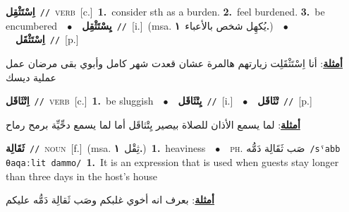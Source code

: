 \documentclass[10pt,a4paper,twoside]{article} %
\begin{document}
\begin{multicols}{2}
{{{{{{{{\setlength\topsep{0pt}\textbf{\foreignlanguage{arabic}{اِسْتَثْقِل}}\ {\color{gray}\texttt{//}\color{black}}\ \textsc{verb}\ [c.]\ \textbf{1.}~consider sth as a burden.  \textbf{2.}~feel burdened.  \textbf{3.}~be encumbered\ \ $\bullet$\ \ \setlength\topsep{0pt}\textbf{\foreignlanguage{arabic}{يِسْتَثْقِل}}\ {\color{gray}\texttt{//}\color{black}}\ [i.]\ \color{gray}(msa. \foreignlanguage{arabic}{يُكهِل شخص بالأعباء}~\foreignlanguage{arabic}{\textbf{١.}})\color{black}\ \ $\bullet$\ \ \setlength\topsep{0pt}\textbf{\foreignlanguage{arabic}{اِسْتَثْقَل}}\ {\color{gray}\texttt{//}\color{black}}\ [p.]\  \begin{flushright}\color{gray}\foreignlanguage{arabic}{\textbf{\underline{\foreignlanguage{arabic}{أمثلة}}}: أنا اِسْتَثْقَلِت زيارتهم هالمرة عشان قعدت شهر كامل وأبوي بقى مرضان عمل عملية ديسك}\end{flushright}\color{black}} \vspace{2mm}

{\setlength\topsep{0pt}\textbf{\foreignlanguage{arabic}{اِتْثَاقَل}}\ {\color{gray}\texttt{//}\color{black}}\ \textsc{verb}\ [c.]\ \textbf{1.}~be sluggish\ \ $\bullet$\ \ \setlength\topsep{0pt}\textbf{\foreignlanguage{arabic}{يِتْثَاقَل}}\ {\color{gray}\texttt{//}\color{black}}\ [i.]\ \ $\bullet$\ \ \setlength\topsep{0pt}\textbf{\foreignlanguage{arabic}{تْثَاقَل}}\ {\color{gray}\texttt{//}\color{black}}\ [p.]\  \begin{flushright}\color{gray}\foreignlanguage{arabic}{\textbf{\underline{\foreignlanguage{arabic}{أمثلة}}}: لما يسمع الأذان للصلاة بيصير يِتْثاقَل أما لما يسمع دحِّيِّة برمح رماح}\end{flushright}\color{black}} \vspace{2mm}

{\setlength\topsep{0pt}\textbf{\foreignlanguage{arabic}{ثَقَالِة}}\ {\color{gray}\texttt{//}\color{black}}\ \textsc{noun}\ [f.]\ \color{gray}(msa. \foreignlanguage{arabic}{ثِقْل}~\foreignlanguage{arabic}{\textbf{١.}})\color{black}\ \textbf{1.}~heaviness\ \ $\bullet$\ \ \textsc{ph.} \color{gray} \foreignlanguage{arabic}{صَب ثَقَالِة دَمُّه}\color{black}\ {\color{gray}\texttt{/{\sffamily sˤabb θaqaːlit dammo}/}\color{black}}\ \textbf{1.}~It is an expression that is used when guests stay longer than three days in the host's house\  \begin{flushright}\color{gray}\foreignlanguage{arabic}{\textbf{\underline{\foreignlanguage{arabic}{أمثلة}}}: بعرف انه أخوي غلبكم وصَب ثَقالِة دَمُّه عليكم}\end{flushright}\color{black}} \vspace{2mm}

}}}}}}}
\end{multicols}
\end{document}
